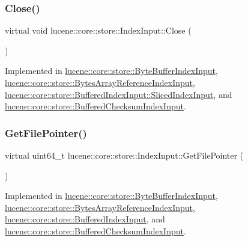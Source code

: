 \subsubsection{\texorpdfstring{Close()}{Close()}}
{\footnotesize\ttfamily virtual void lucene\+::core\+::store\+::\+Index\+Input\+::\+Close (\begin{DoxyParamCaption}{ }\end{DoxyParamCaption})\hspace{0.3cm}{\ttfamily [pure virtual]}}



Implemented in \mbox{\hyperlink{classlucene_1_1core_1_1store_1_1ByteBufferIndexInput_af02f6df059efa32b8d60cec43723d488}{lucene\+::core\+::store\+::\+Byte\+Buffer\+Index\+Input}}, \mbox{\hyperlink{classlucene_1_1core_1_1store_1_1BytesArrayReferenceIndexInput_a99a7277bb3fd32f5d184f31c1fa05c5f}{lucene\+::core\+::store\+::\+Bytes\+Array\+Reference\+Index\+Input}}, \mbox{\hyperlink{classlucene_1_1core_1_1store_1_1BufferedIndexInput_1_1SlicedIndexInput_abb75cb398fdd503e67eeca9c057cc604}{lucene\+::core\+::store\+::\+Buffered\+Index\+Input\+::\+Sliced\+Index\+Input}}, and \mbox{\hyperlink{classlucene_1_1core_1_1store_1_1BufferedChecksumIndexInput_afdc432b747889c61d2452c532e18f2ed}{lucene\+::core\+::store\+::\+Buffered\+Checksum\+Index\+Input}}.

\mbox{\label{classlucene_1_1core_1_1store_1_1IndexInput_acd8f7eae5d3518db7e498507c68990af}} 
\subsubsection{\texorpdfstring{Get\+File\+Pointer()}{GetFilePointer()}}
{\footnotesize\ttfamily virtual uint64\+\_\+t lucene\+::core\+::store\+::\+Index\+Input\+::\+Get\+File\+Pointer (\begin{DoxyParamCaption}{ }\end{DoxyParamCaption})\hspace{0.3cm}{\ttfamily [pure virtual]}}



Implemented in \mbox{\hyperlink{classlucene_1_1core_1_1store_1_1ByteBufferIndexInput_a820ded57153788dfb338c332ec62b499}{lucene\+::core\+::store\+::\+Byte\+Buffer\+Index\+Input}}, \mbox{\hyperlink{classlucene_1_1core_1_1store_1_1BytesArrayReferenceIndexInput_ad898d763272afa0b81b9d376ef398389}{lucene\+::core\+::store\+::\+Bytes\+Array\+Reference\+Index\+Input}}, \mbox{\hyperlink{classlucene_1_1core_1_1store_1_1BufferedIndexInput_a5a47bbae63d295cd569638aeb678399b}{lucene\+::core\+::store\+::\+Buffered\+Index\+Input}}, and \mbox{\hyperlink{classlucene_1_1core_1_1store_1_1BufferedChecksumIndexInput_abd1f04dcbc1c6ede194ce803f8b57032}{lucene\+::core\+::store\+::\+Buffered\+Checksum\+Index\+Input}}.

